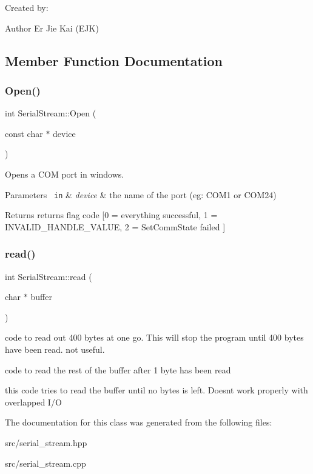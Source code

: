 Created by\+: \begin{DoxyAuthor}{Author}
Er Jie Kai (E\+JK) 
\end{DoxyAuthor}


\subsection{Member Function Documentation}
\mbox{\label{class_serial_stream_aded9d00bc991493ec5e9ee92541b7d5e}} 
\subsubsection{\texorpdfstring{Open()}{Open()}}
{\footnotesize\ttfamily int Serial\+Stream\+::\+Open (\begin{DoxyParamCaption}\item[{const char $\ast$}]{device }\end{DoxyParamCaption})}



Opens a C\+OM port in windows. 


\begin{DoxyParams}[1]{Parameters}
\mbox{\texttt{ in}}  & {\em device} & the name of the port (eg\+: C\+O\+M1 or C\+O\+M24)\\
\hline
\end{DoxyParams}
\begin{DoxyReturn}{Returns}
returns flag code \mbox{[}0 = everything successful, 1 = I\+N\+V\+A\+L\+I\+D\+\_\+\+H\+A\+N\+D\+L\+E\+\_\+\+V\+A\+L\+UE, 2 = Set\+Comm\+State failed \mbox{]} 
\end{DoxyReturn}
\mbox{\label{class_serial_stream_a4a1c1d52b598a7cb1597f8cc0450f395}} 
\subsubsection{\texorpdfstring{read()}{read()}}
{\footnotesize\ttfamily int Serial\+Stream\+::read (\begin{DoxyParamCaption}\item[{char $\ast$}]{buffer }\end{DoxyParamCaption})}

code to read out 400 bytes at one go. This will stop the program until 400 bytes have been read. not useful.

code to read the rest of the buffer after 1 byte has been read

this code tries to read the buffer until no bytes is left. Doesnt work properly with overlapped I/O 

The documentation for this class was generated from the following files\+:\begin{DoxyCompactItemize}
\item 
src/serial\+\_\+stream.\+hpp\item 
src/serial\+\_\+stream.\+cpp\end{DoxyCompactItemize}
